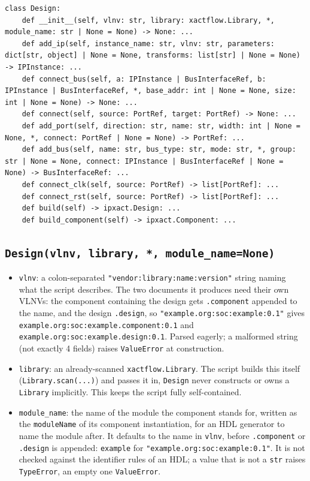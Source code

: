 \documentclass[11pt]{article}
\newcommand{\code}[1]{\texttt{#1}}
\begin{document}
\begin{lstlisting}[style=pyblock, caption={The \texttt{Design} API surface.}]
class Design:
    def __init__(self, vlnv: str, library: xactflow.Library, *, module_name: str | None = None) -> None: ...
    def add_ip(self, instance_name: str, vlnv: str, parameters: dict[str, object] | None = None, transforms: list[str] | None = None) -> IPInstance: ...
    def connect_bus(self, a: IPInstance | BusInterfaceRef, b: IPInstance | BusInterfaceRef, *, base_addr: int | None = None, size: int | None = None) -> None: ...
    def connect(self, source: PortRef, target: PortRef) -> None: ...
    def add_port(self, direction: str, name: str, width: int | None = None, *, connect: PortRef | None = None) -> PortRef: ...
    def add_bus(self, name: str, bus_type: str, mode: str, *, group: str | None = None, connect: IPInstance | BusInterfaceRef | None = None) -> BusInterfaceRef: ...
    def connect_clk(self, source: PortRef) -> list[PortRef]: ...
    def connect_rst(self, source: PortRef) -> list[PortRef]: ...
    def build(self) -> ipxact.Design: ...
    def build_component(self) -> ipxact.Component: ...
\end{lstlisting}

\subsection{\texttt{Design(vlnv, library, *, module\_name=None)}}

\begin{itemize}
    \item \code{vlnv}: a colon-separated \code{"vendor:library:name:version"} string
    naming what the script describes. The two documents it produces need their own
    VLNVs: the component containing the design gets \code{.component} appended to the
    name, and the design \code{.design}, so \code{"example.org:soc:example:0.1"} gives
    \code{example.org:soc:example.component:0.1} and
    \code{example.org:soc:example.design:0.1}. Parsed eagerly; a malformed string (not
    exactly 4 fields) raises \code{ValueError} at construction.
    \item \code{library}: an already-scanned \code{xactflow.Library}. The script builds
    this itself (\code{Library.scan(...)}) and passes it in, \code{Design} never
    constructs or owns a \code{Library} implicitly. This keeps the script fully
    self-contained.
    \item \code{module\_name}: the name of the module the component stands for, written
    as the \code{moduleName} of its component instantiation, for an HDL generator to name
    the module after. It defaults to the name in \code{vlnv}, before \code{.component} or
    \code{.design} is appended: \code{example} for \code{"example.org:soc:example:0.1"}.
    It is not checked against the identifier rules of an HDL; a value that is not a
    \code{str} raises \code{TypeError}, an empty one \code{ValueError}.
\end{itemize}
\end{document}

